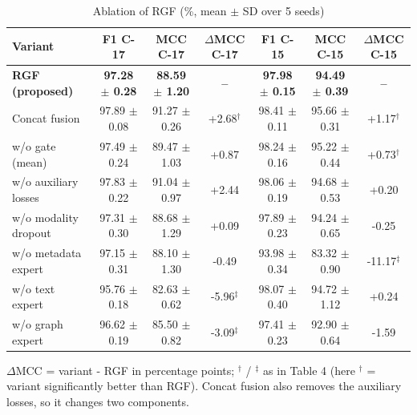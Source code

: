 \begin{table}[!t]
\centering
\caption{Ablation of RGF (\%, mean $\pm$ SD over 5 seeds)}
\label{tab:ablation}
\footnotesize
\setlength{\tabcolsep}{3pt}
\begin{tabular}{lcccccc}
\hline
\textbf{Variant} & \textbf{F1 C-17} & \textbf{MCC C-17} & \textbf{$\Delta$MCC C-17} & \textbf{F1 C-15} & \textbf{MCC C-15} & \textbf{$\Delta$MCC C-15} \\
\hline
\textbf{RGF (proposed)} & \textbf{97.28 $\pm$ 0.28} & \textbf{88.59 $\pm$ 1.20} & \textbf{--} & \textbf{97.98 $\pm$ 0.15} & \textbf{94.49 $\pm$ 0.39} & \textbf{--} \\
Concat fusion & 97.89 $\pm$ 0.08 & 91.27 $\pm$ 0.26 & +2.68$^\dagger$ & 98.41 $\pm$ 0.11 & 95.66 $\pm$ 0.31 & +1.17$^\dagger$ \\
w/o gate (mean) & 97.49 $\pm$ 0.24 & 89.47 $\pm$ 1.03 & +0.87 & 98.24 $\pm$ 0.16 & 95.22 $\pm$ 0.44 & +0.73$^\dagger$ \\
w/o auxiliary losses & 97.83 $\pm$ 0.22 & 91.04 $\pm$ 0.97 & +2.44 & 98.06 $\pm$ 0.19 & 94.68 $\pm$ 0.53 & +0.20 \\
w/o modality dropout & 97.31 $\pm$ 0.30 & 88.68 $\pm$ 1.29 & +0.09 & 97.89 $\pm$ 0.23 & 94.24 $\pm$ 0.65 & -0.25 \\
w/o metadata expert & 97.15 $\pm$ 0.31 & 88.10 $\pm$ 1.30 & -0.49 & 93.98 $\pm$ 0.34 & 83.32 $\pm$ 0.90 & -11.17$^\ddagger$ \\
w/o text expert & 95.76 $\pm$ 0.18 & 82.63 $\pm$ 0.62 & -5.96$^\ddagger$ & 98.07 $\pm$ 0.40 & 94.72 $\pm$ 1.12 & +0.24 \\
w/o graph expert & 96.62 $\pm$ 0.19 & 85.50 $\pm$ 0.82 & -3.09$^\ddagger$ & 97.41 $\pm$ 0.23 & 92.90 $\pm$ 0.64 & -1.59 \\
\hline
\end{tabular}
\par\smallskip\parbox{\linewidth}{\scriptsize $\Delta$MCC = variant - RGF in percentage points; $^\dagger$ / $^\ddagger$ as in Table 4 (here $^\dagger$ = variant significantly better than RGF). Concat fusion also removes the auxiliary losses, so it changes two components.}
\end{table}


